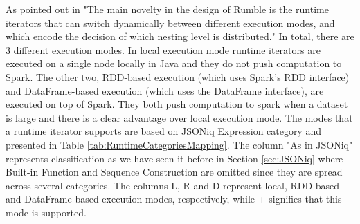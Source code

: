 As pointed out in \cite{RumblePaper} "The main novelty in the design of Rumble is the runtime iterators that can switch dynamically between different execution modes, and which encode the decision of which nesting level is distributed." In total, there are 3 different execution modes. In local execution mode runtime iterators are executed on a single node locally in Java and they do not push computation to Spark. The other two, RDD-based execution (which uses Spark’s RDD interface) and  DataFrame-based execution (which uses the DataFrame interface), are executed on top of Spark. They both push computation to spark when a dataset is large and there is a clear advantage over local execution mode. The modes that a runtime iterator supports are based on JSONiq Expression category and presented in Table \ref{tab:RuntimeCategoriesMapping}. The column "As in JSONiq" represents classification as we have seen it before in Section \ref{sec:JSONiq} where Built-in Function and Sequence Construction are omitted since they are spread across several categories. The columns L, R and D represent local, RDD-based and DataFrame-based execution modes, respectively, while + signifies that this mode is supported.

